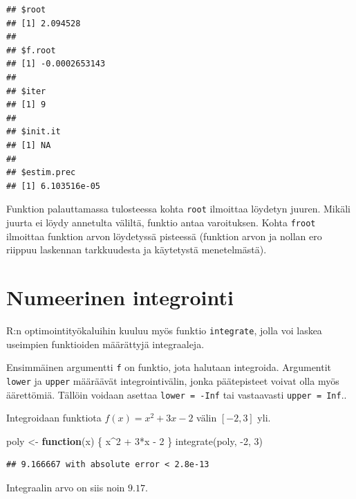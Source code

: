 \documentclass[
]{book}
\newenvironment{Shaded}{\begin{snugshade}}{\end{snugshade}}
\newcommand{\AttributeTok}[1]{\textcolor[rgb]{0.77,0.63,0.00}{#1}}
\newcommand{\ConstantTok}[1]{\textcolor[rgb]{0.00,0.00,0.00}{#1}}
\newcommand{\ControlFlowTok}[1]{\textcolor[rgb]{0.13,0.29,0.53}{\textbf{#1}}}
\newcommand{\DecValTok}[1]{\textcolor[rgb]{0.00,0.00,0.81}{#1}}
\newcommand{\FloatTok}[1]{\textcolor[rgb]{0.00,0.00,0.81}{#1}}
\newcommand{\FunctionTok}[1]{\textcolor[rgb]{0.00,0.00,0.00}{#1}}
\newcommand{\NormalTok}[1]{#1}
\newcommand{\OtherTok}[1]{\textcolor[rgb]{0.56,0.35,0.01}{#1}}
\newcommand{\SpecialCharTok}[1]{\textcolor[rgb]{0.00,0.00,0.00}{#1}}
\begin{document}
\begin{verbatim}
## $root
## [1] 2.094528
## 
## $f.root
## [1] -0.0002653143
## 
## $iter
## [1] 9
## 
## $init.it
## [1] NA
## 
## $estim.prec
## [1] 6.103516e-05
\end{verbatim}

Funktion palauttamassa tulosteessa kohta \texttt{root} ilmoittaa löydetyn juuren. Mikäli juurta ei löydy annetulta väliltä, funktio antaa varoituksen. Kohta \texttt{froot} ilmoittaa funktion arvon löydetyssä pisteessä (funktion arvon ja nollan ero riippuu laskennan tarkkuudesta ja käytetystä menetelmästä).

\hypertarget{numeerinen-integrointi}{%
\section{Numeerinen integrointi}\label{numeerinen-integrointi}}

R:n optimointityökaluihin kuuluu myös funktio \texttt{integrate}, jolla voi laskea useimpien funktioiden määrättyjä integraaleja.

\begin{Shaded}
\end{Shaded}

Ensimmäinen argumentti \texttt{f} on funktio, jota halutaan integroida. Argumentit \texttt{lower} ja \texttt{upper} määräävät integrointivälin, jonka päätepisteet voivat olla myös äärettömiä. Tällöin voidaan asettaa \texttt{lower\ =\ -Inf} tai vastaavasti \texttt{upper\ =\ Inf}..

Integroidaan funktiota \(f(x) = x^2+3x-2\) välin \([-2,3]\) yli.

\begin{Shaded}
\begin{Highlighting}[]
\NormalTok{poly }\OtherTok{\textless{}{-}} \ControlFlowTok{function}\NormalTok{(x) \{ x}\SpecialCharTok{\^{}}\DecValTok{2} \SpecialCharTok{+} \DecValTok{3}\SpecialCharTok{*}\NormalTok{x }\SpecialCharTok{{-}} \DecValTok{2}\NormalTok{ \}}
\FunctionTok{integrate}\NormalTok{(poly, }\SpecialCharTok{{-}}\DecValTok{2}\NormalTok{, }\DecValTok{3}\NormalTok{)}
\end{Highlighting}
\end{Shaded}

\begin{verbatim}
## 9.166667 with absolute error < 2.8e-13
\end{verbatim}

Integraalin arvo on siis noin \(9.17\).
\end{document}
